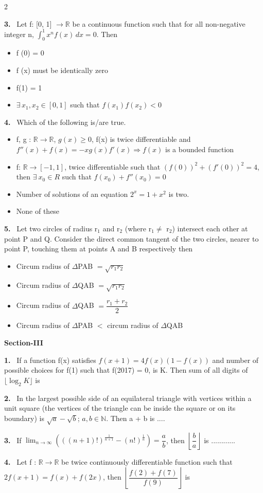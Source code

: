 \documentclass[10pt]{extarticle}
\newcommand{\sect}[1]{\par\smallskip\noindent\textbf{#1}\par}
\newcommand{\qn}[1]{\par\smallskip\noindent\textbf{#1.}~}
\newenvironment{qoptions}{\begin{itemize}[leftmargin=1.8em,itemsep=1pt,topsep=2pt,label={}]}{\end{itemize}}
\newcommand{\opt}[2]{\item[(#1)] #2}
\begin{document}
\begin{multicols}{2}
\qn{3} Let f: [0, 1] $\to\mathbb R$ be a continuous function such that for all non-negative integer n, $\displaystyle\int_0^1x^nf(x)\,dx=0$. Then
\begin{qoptions}
\opt{A}{f (0) = 0}
\opt{B}{f (x) must be identically zero}
\opt{C}{f(1) = 1}
\opt{D}{$\exists\,x_1,x_2\in[0,1]$ such that $f(x_1)f(x_2)<0$}
\end{qoptions}

\qn{4} Which of the following is/are true.
\begin{qoptions}
\opt{A}{f, g : $\mathbb R\to\mathbb R$, $g(x)\ge0$, f(x) is twice differentiable and $f''(x)+f(x)=-xg(x)f'(x)\Rightarrow f(x)$ is a bounded function}
\opt{B}{f: $\mathbb R\to[-1,1]$, twice differentiable such that $(f(0))^2+(f'(0))^2=4$, then $\exists\ x_0\in R$ such that $f(x_0)+f''(x_0)=0$}
\opt{C}{Number of solutions of an equation $2^x=1+x^2$ is two.}
\opt{D}{None of these}
\end{qoptions}

\qn{5} Let two circles of radius r$_1$ and r$_2$ (where r$_1\ne$ r$_2$) intersect each other at point P and Q. Consider the direct common tangent of the two circles, nearer to point P, touching them at points A and B respectively then
\begin{qoptions}
\opt{A}{Circum radius of $\Delta$PAB $=\sqrt{r_1r_2}$}
\opt{B}{Circum radius of $\Delta$QAB $=\sqrt{r_1r_2}$}
\opt{C}{Circum radius of $\Delta$QAB $=\dfrac{r_1+r_2}{2}$}
\opt{D}{Circum radius of $\Delta$PAB $<$ circum radius of $\Delta$QAB}
\end{qoptions}

\sect{Section-III}

\qn{1} If a function f(x) satisfies $f(x+1)=4f(x)(1-f(x))$ and number of possible choices for f(1) such that f(2017) = 0, is K. Then sum of all digits of $\lfloor\log_2K\rfloor$ is \underline{\hspace{1.5cm}}

\qn{2} In the largest possible side of an equilateral triangle with vertices within a unit square (the vertices of the triangle can be inside the square or on its boundary) is $\sqrt a-\sqrt b$; $a,b\in\mathbb N$. Then a + b is ....

\qn{3} If $\displaystyle\lim_{n\to\infty}\left(((n+1)!)^{\frac1{n+1}}-(n!)^{\frac1n}\right)=\dfrac ab$, then $\left\lfloor\dfrac ba\right\rfloor$ is ............

\qn{4} Let f : $\mathbb R\to\mathbb R$ be twice continuously differentiable function such that $2f(x+1)=f(x)+f(2x)$, then $\left\lfloor\dfrac{f(2)+f(7)}{f(9)}\right\rfloor$ is \underline{\hspace{1.5cm}}


\end{multicols}
\end{document}

